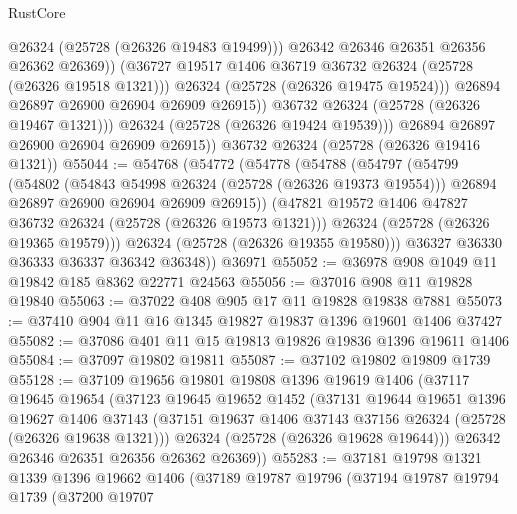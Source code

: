 \begin{lexlean}{RustCore}
\begin{coremodule}
                        @26324
                        (@25728 (@26326 @19483 @19499)))
                      @26342
                      @26346
                      @26351
                      @26356
                      @26362
                      @26369))
                  (@36727 @19517 @1406 @36719 @36732 @26324 (@25728 (@26326 @19518 @1321)))
                  @26324
                  (@25728 (@26326 @19475 @19524)))
                @26894
                @26897
                @26900
                @26904
                @26909
                @26915))
            @36732
            @26324
            (@25728 (@26326 @19467 @1321)))
          @26324
          (@25728 (@26326 @19424 @19539)))
        @26894
        @26897
        @26900
        @26904
        @26909
        @26915))
    @36732
    @26324
    (@25728 (@26326 @19416 @1321))
@55044 := @54768
    (@54772
      (@54778
        (@54788
          (@54797
            (@54799
              (@54802
                (@54843 @54998 @26324 (@25728 (@26326 @19373 @19554)))
                @26894
                @26897
                @26900
                @26904
                @26909
                @26915))
            (@47821 @19572 @1406 @47827 @36732 @26324 (@25728 (@26326 @19573 @1321)))
            @26324
            (@25728 (@26326 @19365 @19579)))
          @26324
          (@25728 (@26326 @19355 @19580)))
        @36327
        @36330
        @36333
        @36337
        @36342
        @36348))
    @36971
@55052 := @36978 @908 @1049 @11 @19842 @185 @8362 @22771 @24563
@55056 := @37016 @908 @11 @19828 @19840
@55063 := @37022 @408 @905 @17 @11 @19828 @19838 @7881
@55073 := @37410 @904 @11 @16 @1345 @19827 @19837 @1396 @19601 @1406 @37427
@55082 := @37086 @401 @11 @15 @19813 @19826 @19836 @1396 @19611 @1406
@55084 := @37097 @19802 @19811
@55087 := @37102 @19802 @19809 @1739
@55128 := @37109
    @19656
    @19801
    @19808
    @1396
    @19619
    @1406
    (@37117
      @19645
      @19654
      (@37123
        @19645
        @19652
        @1452
        (@37131
          @19644
          @19651
          @1396
          @19627
          @1406
          @37143
          (@37151 @19637 @1406 @37143 @37156 @26324 (@25728 (@26326 @19638 @1321)))
          @26324
          (@25728 (@26326 @19628 @19644)))
        @26342
        @26346
        @26351
        @26356
        @26362
        @26369))
@55283 := @37181
    @19798
    @1321
    @1339
    @1396
    @19662
    @1406
    (@37189
      @19787
      @19796
      (@37194
        @19787
        @19794
        @1739
        (@37200
          @19707

\end{coremodule}
\end{lexlean}
